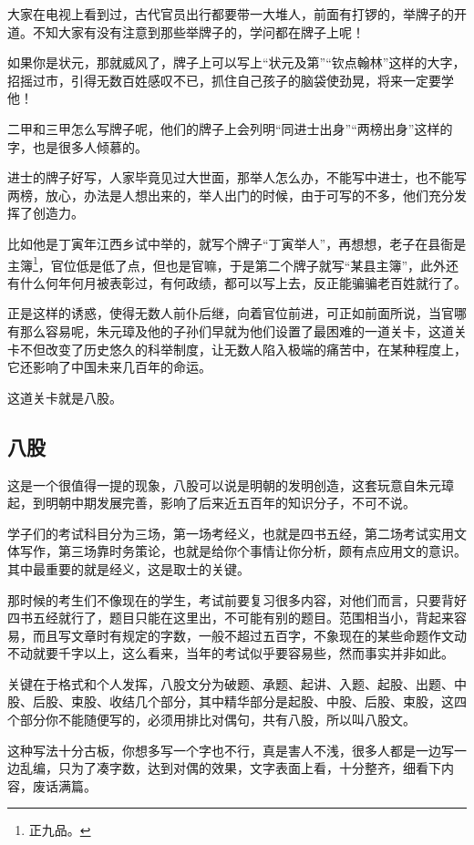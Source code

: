 \begin{multicols}{\theparacolNo}
		大家在电视上看到过，古代官员出行都要带一大堆人，前面有打锣的，举牌子的开道。不知大家有没有注意到那些举牌子的，学问都在牌子上呢！

		如果你是状元，那就威风了，牌子上可以写上“状元及第”“钦点翰林”这样的大字，招摇过市，引得无数百姓感叹不已，抓住自己孩子的脑袋使劲晃，将来一定要学他！

		二甲和三甲怎么写牌子呢，他们的牌子上会列明“同进士出身”“两榜出身”这样的字，也是很多人倾慕的。

		进士的牌子好写，人家毕竟见过大世面，那举人怎么办，不能写中进士，也不能写两榜，放心，办法是人想出来的，举人出门的时候，由于可写的不多，他们充分发挥了创造力。

		比如他是丁寅年江西乡试中举的，就写个牌子“丁寅举人”，再想想，老子在县衙是主簿\footnote{正九品。}，官位低是低了点，但也是官嘛，于是第二个牌子就写“某县主簿”，此外还有什么何年何月被表彰过，有何政绩，都可以写上去，反正能骗骗老百姓就行了。

		正是这样的诱惑，使得无数人前仆后继，向着官位前进，可正如前面所说，当官哪有那么容易呢，朱元璋及他的子孙们早就为他们设置了最困难的一道关卡，这道关卡不但改变了历史悠久的科举制度，让无数人陷入极端的痛苦中，在某种程度上，它还影响了中国未来几百年的命运。

		这道关卡就是八股。

		\subsection{八股}
		这是一个很值得一提的现象，八股可以说是明朝的发明创造，这套玩意自朱元璋起，到明朝中期发展完善，影响了后来近五百年的知识分子，不可不说。

		学子们的考试科目分为三场，第一场考经义，也就是四书五经，第二场考试实用文体写作，第三场靠时务策论，也就是给你个事情让你分析，颇有点应用文的意识。其中最重要的就是经义，这是取士的关键。

		那时候的考生们不像现在的学生，考试前要复习很多内容，对他们而言，只要背好四书五经就行了，题目只能在这里出，不可能有别的题目。范围相当小，背起来容易，而且写文章时有规定的字数，一般不超过五百字，不象现在的某些命题作文动不动就要千字以上，这么看来，当年的考试似乎要容易些，然而事实并非如此。

		关键在于格式和个人发挥，八股文分为破题、承题、起讲、入题、起股、出题、中股、后股、束股、收结几个部分，其中精华部分是起股、中股、后股、束股，这四个部分你不能随便写的，必须用排比对偶句，共有八股，所以叫八股文。

		这种写法十分古板，你想多写一个字也不行，真是害人不浅，很多人都是一边写一边乱编，只为了凑字数，达到对偶的效果，文字表面上看，十分整齐，细看下内容，废话满篇。


\end{multicols}
